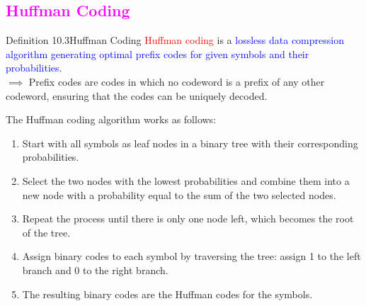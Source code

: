 \documentclass{book}
\begin{document}
\newpage
\textcolor{magenta}{\section{\textbf{Huffman Coding}}}
\begin{defBox}{Definition 10.3}{Huffman Coding}
    \textcolor{red}{Huffman coding} is a \textcolor{blue}{lossless data compression algorithm generating optimal prefix codes for given symbols and their probabilities}.\\
    $\implies$ Prefix codes are codes in which no codeword is a prefix of any other codeword, ensuring that the codes can be uniquely decoded.
\end{defBox}
The Huffman coding algorithm works as follows:
\begin{enumerate}
    \item Start with all symbols as leaf nodes in a binary tree with their corresponding probabilities.
    \item Select the two nodes with the lowest probabilities and combine them into a new node with a probability equal to the sum of the two selected nodes.
    \item Repeat the process until there is only one node left, which becomes the root of the tree.
    \item Assign binary codes to each symbol by traversing the tree: assign 1 to the left branch and 0 to the right branch.
    \item The resulting binary codes are the Huffman codes for the symbols.
\end{enumerate}
\end{document}
